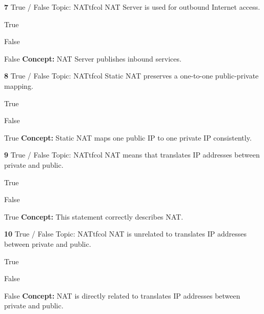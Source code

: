 \documentclass[10pt,a4paper]{article}
\begin{document}
\begin{qcard}{\color{white}\textbf{7} \hfill \small True / False \textbar{} Topic: NAT}{tfcol}
NAT Server is used for outbound Internet access.

\begin{qoptions}
\item True
\item False
\end{qoptions}
\begin{explainbox}{False}
\textbf{Concept:} NAT Server publishes inbound services.
\end{explainbox}
\end{qcard}

\begin{qcard}{\color{white}\textbf{8} \hfill \small True / False \textbar{} Topic: NAT}{tfcol}
Static NAT preserves a one-to-one public-private mapping.

\begin{qoptions}
\item True
\item False
\end{qoptions}
\begin{explainbox}{True}
\textbf{Concept:} Static NAT maps one public IP to one private IP consistently.
\end{explainbox}
\end{qcard}

\begin{qcard}{\color{white}\textbf{9} \hfill \small True / False \textbar{} Topic: NAT}{tfcol}
NAT means that translates IP addresses between private and public.

\begin{qoptions}
\item True
\item False
\end{qoptions}
\begin{explainbox}{True}
\textbf{Concept:} This statement correctly describes NAT.
\end{explainbox}
\end{qcard}

\begin{qcard}{\color{white}\textbf{10} \hfill \small True / False \textbar{} Topic: NAT}{tfcol}
NAT is unrelated to translates IP addresses between private and public.

\begin{qoptions}
\item True
\item False
\end{qoptions}
\begin{explainbox}{False}
\textbf{Concept:} NAT is directly related to translates IP addresses between private and public.
\end{explainbox}
\end{qcard}
\end{document}
